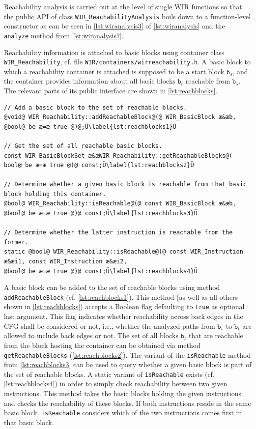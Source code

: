 Reachability analysis is carried out at the level of single \gls{WIR} functions so that the public \gls{API} of class \texttt{WIR\_Reach\-abilityAnalysis} boils down to a function-level constructor as can be seen in \cref{lst:wiranalysis3} of \cref{lst:wiranalysis} and the \texttt{analyze} method from \cref{lst:wiranalysis7}.

Reachability information is attached to basic blocks using container class \texttt{WIR\_Reachability}, cf. file \texttt{WIR/con\-tainers/wirreachability.h}.
A basic block to which a reachability container is attached is supposed to be a start block $\texttt{b}_s$, and the container provides information about all basic blocks $\texttt{b}_t$ reachable from $\texttt{b}_s$.
The relevant parts of its public interface are shown in \cref{lst:reachblocks}.

\begin{lstlisting}[style=code,float=h,caption={Reachability Handling of Container Class \texttt{WIR\_Reachability}},label=lst:reachblocks]
// Add a basic block to the set of reachable blocks.
@void@ WIR_Reachability::addReachableBlock@(@ WIR_BasicBlock æ&æb, @bool@ be æ=æ true @)@;Ü\label{lst:reachblocks1}Ü

// Get the set of all reachable basic blocks.
const WIR_BasicBlockSet æ&æWIR_Reachability::getReachableBlocks@( bool@ be æ=æ true @)@ const;Ü\label{lst:reachblocks2}Ü

// Determine whether a given basic block is reachable from that basic block holding this container.
@bool@ WIR_Reachability::isReachable@(@ const WIR_BasicBlock æ&æb, @bool@ be æ=æ true @)@ const;Ü\label{lst:reachblocks3}Ü

// Determine whether the latter instruction is reachable from the former.
static @bool@ WIR_Reachability::isReachable@(@ const WIR_Instruction æ&æi1, const WIR_Instruction æ&æi2,                                                     @bool@ be æ=æ true @)@ const;Ü\label{lst:reachblocks4}Ü
\end{lstlisting}

A basic block can be added to the set of reachable blocks using method \texttt{addReachableBlock} (cf. \cref{lst:reachblocks1}).
This method (as well as all others shown in \cref{lst:reachblocks}) accepts a Boolean flag defaulting to \texttt{true} as optional last argument.
This flag indicates whether reachability across back edges in the \gls{CFG} shall be considered or not, i.e., whether the analyzed paths from $\texttt{b}_s$ to $\texttt{b}_t$ are allowed to include back edges or not.
The set of all blocks $\texttt{b}_t$ that are reachable from the block hosting the container can be obtained via method \texttt{getReachableBlocks} (\cref{lst:reachblocks2}).
The variant of the \texttt{isReachable} method from \cref{lst:reachblocks3} can be used to query whether a given basic block is part of the set of reachable blocks.
A static variant of \texttt{isReachable} exists (cf. \cref{lst:reachblocks4}) in order to simply check reachability between two given instructions.
This method takes the basic blocks holding the given instructions and checks the reachability of these blocks.
If both instructions reside in the same basic block, \texttt{isReachable} considers which of the two instructions comes first in that basic block.

